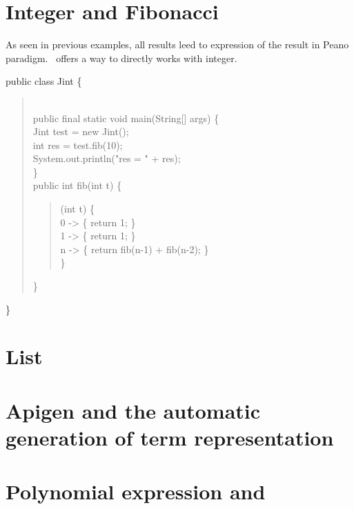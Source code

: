 \section{Integer and Fibonacci}
As seen in previous examples, all results leed to expression of the
result in Peano paradigm. \TOM\ offers a way to directly works with
integer.

public class Jint \{\\
\begin{quote}
  \typeint\\
  public final static void main(String[] args) \{\\
    Jint test = new Jint();\\
    int res = test.fib(10);\\
    System.out.println("res = " + res);\\
  \}\\
  public int fib(int t) \{\\
\begin{quote}
    \match(\textsf{int t}) \{\\
      \textsf{0} -> \{ return 1; \}\\
      \textsf{1} -> \{ return 1; \}\\
      \textsf{n} -> \{ return fib(n-1) + fib(n-2); \}\\
    \}\\
\end{quote}
  \}\\
\end{quote}
\}\\

\section{List}

\section{Apigen and the automatic generation of term representation}

\section{Polynomial expression and \TOM}
